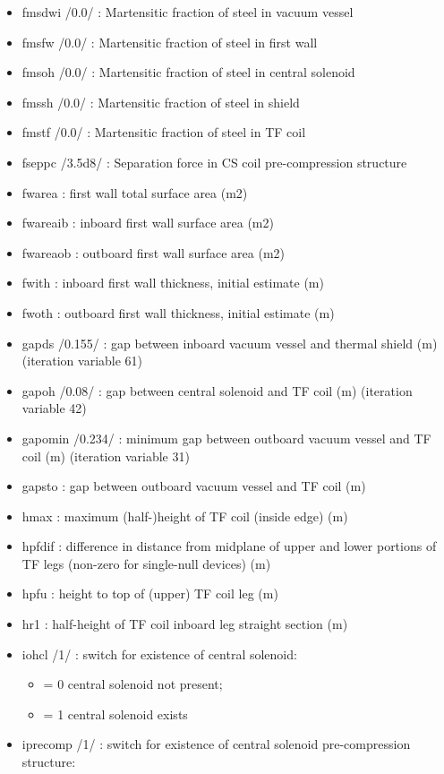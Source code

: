 \documentclass[]{article}
\providecommand{\tightlist}{%
  \setlength{\itemsep}{0pt}\setlength{\parskip}{0pt}}
\begin{document}
\begin{itemize}
\item
  fmsdwi /0.0/ : Martensitic fraction of steel in vacuum vessel
\item
  fmsfw /0.0/ : Martensitic fraction of steel in first wall
\item
  fmsoh /0.0/ : Martensitic fraction of steel in central solenoid
\item
  fmssh /0.0/ : Martensitic fraction of steel in shield
\item
  fmstf /0.0/ : Martensitic fraction of steel in TF coil
\item
  fseppc /3.5d8/ : Separation force in CS coil pre-compression structure
\item
  fwarea : first wall total surface area (m2)
\item
  fwareaib : inboard first wall surface area (m2)
\item
  fwareaob : outboard first wall surface area (m2)
\item
  fwith : inboard first wall thickness, initial estimate (m)
\item
  fwoth : outboard first wall thickness, initial estimate (m)
\item
  gapds /0.155/ : gap between inboard vacuum vessel and thermal shield
  (m) (iteration variable 61)
\item
  gapoh /0.08/ : gap between central solenoid and TF coil (m) (iteration
  variable 42)
\item
  gapomin /0.234/ : minimum gap between outboard vacuum vessel and TF
  coil (m) (iteration variable 31)
\item
  gapsto : gap between outboard vacuum vessel and TF coil (m)
\item
  hmax : maximum (half-)height of TF coil (inside edge) (m)
\item
  hpfdif : difference in distance from midplane of upper and lower
  portions of TF legs (non-zero for single-null devices) (m)
\item
  hpfu : height to top of (upper) TF coil leg (m)
\item
  hr1 : half-height of TF coil inboard leg straight section (m)
\item
  iohcl /1/ : switch for existence of central solenoid:

  \begin{itemize}
  \tightlist
  \item
    = 0 central solenoid not present;
  \item
    = 1 central solenoid exists
  \end{itemize}
\item
  iprecomp /1/ : switch for existence of central solenoid
  pre-compression structure:


\end{itemize}
\end{document}
